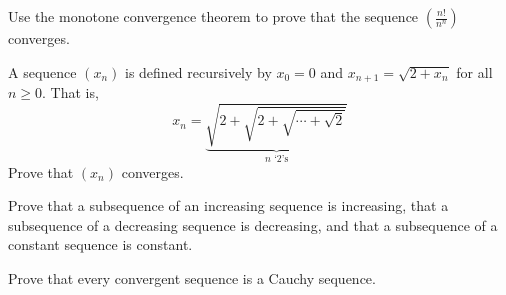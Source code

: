 \begin{exercise}
Use the monotone convergence theorem to prove that the sequence $\left( \frac{n!}{n^n} \right)$ converges.
\end{exercise}

\begin{exercise}
A sequence $(x_n)$ is defined recursively by $x_0 = 0$ and $x_{n+1} = \sqrt{2+x_n}$ for all $n \ge 0$. That is,
\[ x_n = \underbrace{\sqrt{2 + \sqrt{2 + \sqrt{ \cdots + \sqrt{2}}}}}_{n \text{ `2's}} \]
Prove that $(x_n)$ converges.
\end{exercise}


\begin{exercise}
Prove that a subsequence of an increasing sequence is increasing, that a subsequence of a decreasing sequence is decreasing, and that a subsequence of a constant sequence is constant.
\end{exercise}


\begin{exercise}
Prove that every convergent sequence is a Cauchy sequence.
\end{exercise}
